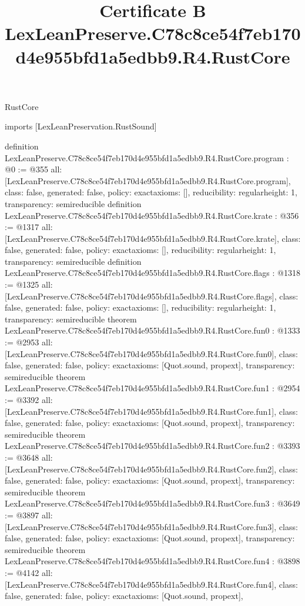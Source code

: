 \begin{lexlean}{RustCore}
\title{Certificate B LexLeanPreserve.C78c8ce54f7eb170d4e955bfd1a5edbb9.R4.RustCore}
\begin{coremodule}
imports [LexLeanPreservation.RustSound]

definition LexLeanPreserve.C78c8ce54f7eb170d4e955bfd1a5edbb9.R4.RustCore.program : @0 := @355 {
  all: [LexLeanPreserve.C78c8ce54f7eb170d4e955bfd1a5edbb9.R4.RustCore.program],
  class: false,
  generated: false,
  policy: exact{axioms: []},
  reducibility: regular{height: 1},
  transparency: semireducible
}
definition LexLeanPreserve.C78c8ce54f7eb170d4e955bfd1a5edbb9.R4.RustCore.krate : @356 := @1317 {
  all: [LexLeanPreserve.C78c8ce54f7eb170d4e955bfd1a5edbb9.R4.RustCore.krate],
  class: false,
  generated: false,
  policy: exact{axioms: []},
  reducibility: regular{height: 1},
  transparency: semireducible
}
definition LexLeanPreserve.C78c8ce54f7eb170d4e955bfd1a5edbb9.R4.RustCore.flags : @1318 := @1325 {
  all: [LexLeanPreserve.C78c8ce54f7eb170d4e955bfd1a5edbb9.R4.RustCore.flags],
  class: false,
  generated: false,
  policy: exact{axioms: []},
  reducibility: regular{height: 1},
  transparency: semireducible
}
theorem LexLeanPreserve.C78c8ce54f7eb170d4e955bfd1a5edbb9.R4.RustCore.fun0 : @1333 := @2953 {
  all: [LexLeanPreserve.C78c8ce54f7eb170d4e955bfd1a5edbb9.R4.RustCore.fun0],
  class: false,
  generated: false,
  policy: exact{axioms: [Quot.sound, propext]},
  transparency: semireducible
}
theorem LexLeanPreserve.C78c8ce54f7eb170d4e955bfd1a5edbb9.R4.RustCore.fun1 : @2954 := @3392 {
  all: [LexLeanPreserve.C78c8ce54f7eb170d4e955bfd1a5edbb9.R4.RustCore.fun1],
  class: false,
  generated: false,
  policy: exact{axioms: [Quot.sound, propext]},
  transparency: semireducible
}
theorem LexLeanPreserve.C78c8ce54f7eb170d4e955bfd1a5edbb9.R4.RustCore.fun2 : @3393 := @3648 {
  all: [LexLeanPreserve.C78c8ce54f7eb170d4e955bfd1a5edbb9.R4.RustCore.fun2],
  class: false,
  generated: false,
  policy: exact{axioms: [Quot.sound, propext]},
  transparency: semireducible
}
theorem LexLeanPreserve.C78c8ce54f7eb170d4e955bfd1a5edbb9.R4.RustCore.fun3 : @3649 := @3897 {
  all: [LexLeanPreserve.C78c8ce54f7eb170d4e955bfd1a5edbb9.R4.RustCore.fun3],
  class: false,
  generated: false,
  policy: exact{axioms: [Quot.sound, propext]},
  transparency: semireducible
}
theorem LexLeanPreserve.C78c8ce54f7eb170d4e955bfd1a5edbb9.R4.RustCore.fun4 : @3898 := @4142 {
  all: [LexLeanPreserve.C78c8ce54f7eb170d4e955bfd1a5edbb9.R4.RustCore.fun4],
  class: false,
  generated: false,
  policy: exact{axioms: [Quot.sound, propext]},
}
\end{coremodule}
\end{lexlean}

